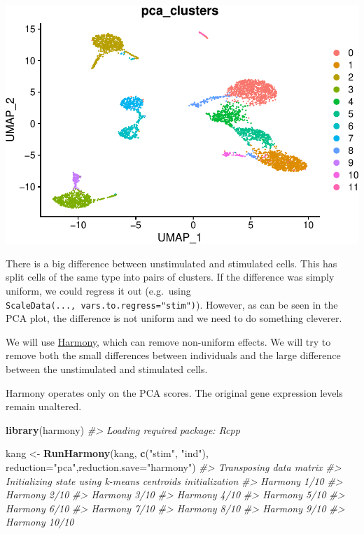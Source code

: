 \documentclass[
]{book}
\newenvironment{Shaded}{\begin{snugshade}}{\end{snugshade}}
\newcommand{\AttributeTok}[1]{\textcolor[rgb]{0.13,0.29,0.53}{#1}}
\newcommand{\CommentTok}[1]{\textcolor[rgb]{0.56,0.35,0.01}{\textit{#1}}}
\newcommand{\FunctionTok}[1]{\textcolor[rgb]{0.13,0.29,0.53}{\textbf{#1}}}
\newcommand{\NormalTok}[1]{#1}
\newcommand{\OtherTok}[1]{\textcolor[rgb]{0.56,0.35,0.01}{#1}}
\newcommand{\StringTok}[1]{\textcolor[rgb]{0.31,0.60,0.02}{#1}}
\begin{document}
\includegraphics{scRNAseqInR_Doco_files/figure-latex/unnamed-chunk-67-3.pdf}

There is a big difference between unstimulated and stimulated cells. This has split cells of the same type into pairs of clusters. If the difference was simply uniform, we could regress it out (e.g.~using \texttt{ScaleData(...,\ vars.to.regress="stim")}). However, as can be seen in the PCA plot, the difference is not uniform and we need to do something cleverer.

We will use \href{https://github.com/immunogenomics/harmony}{Harmony}, which can remove non-uniform effects. We will try to remove both the small differences between individuals and the large difference between the unstimulated and stimulated cells.

Harmony operates only on the PCA scores. The original gene expression levels remain unaltered.

\begin{Shaded}
\begin{Highlighting}[]
\FunctionTok{library}\NormalTok{(harmony)}
\CommentTok{\#\textgreater{} Loading required package: Rcpp}

\NormalTok{kang }\OtherTok{\textless{}{-}} \FunctionTok{RunHarmony}\NormalTok{(kang, }\FunctionTok{c}\NormalTok{(}\StringTok{"stim"}\NormalTok{, }\StringTok{"ind"}\NormalTok{), }\AttributeTok{reduction=}\StringTok{"pca"}\NormalTok{,}\AttributeTok{reduction.save=}\StringTok{"harmony"}\NormalTok{)}
\CommentTok{\#\textgreater{} Transposing data matrix}
\CommentTok{\#\textgreater{} Initializing state using k{-}means centroids initialization}
\CommentTok{\#\textgreater{} Harmony 1/10}
\CommentTok{\#\textgreater{} Harmony 2/10}
\CommentTok{\#\textgreater{} Harmony 3/10}
\CommentTok{\#\textgreater{} Harmony 4/10}
\CommentTok{\#\textgreater{} Harmony 5/10}
\CommentTok{\#\textgreater{} Harmony 6/10}
\CommentTok{\#\textgreater{} Harmony 7/10}
\CommentTok{\#\textgreater{} Harmony 8/10}
\CommentTok{\#\textgreater{} Harmony 9/10}
\CommentTok{\#\textgreater{} Harmony 10/10}
\end{Highlighting}
\end{Shaded}
\end{document}
